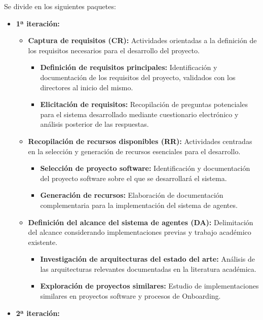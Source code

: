 Se divide en los siguientes paquetes:

\begin{itemize}
  \item\textbf{1ª iteración:}
    \begin{itemize}
      \item\textbf{Captura de requisitos (CR):} Actividades orientadas a la definición de los requisitos necesarios para el desarrollo del proyecto.
            \begin{itemize}
          \item\textbf{Definición de requisitos principales:} Identificación y documentación de los requisitos del proyecto, validados con los directores al inicio del mismo.
          \item\textbf{Elicitación de requisitos:} Recopilación de preguntas potenciales para el sistema desarrollado mediante cuestionario electrónico y análisis posterior de las respuestas.
        \end{itemize}
      \item\textbf{Recopilación de recursos disponibles (RR):} Actividades centradas en la selección y generación de recursos esenciales para el desarrollo.
        \begin{itemize}
          \item\textbf{Selección de proyecto software:} Identificación y documentación del proyecto software sobre el que se desarrollará el sistema.
          \item\textbf{Generación de recursos:} Elaboración de documentación complementaria para la implementación del sistema de agentes.
        \end{itemize}
      \item\textbf{Definición del alcance del sistema de agentes (DA):} Delimitación del alcance considerando implementaciones previas y trabajo académico existente.
    \begin{itemize}
          \item\textbf{Investigación de arquitecturas del estado del arte:} Análisis de las arquitecturas relevantes documentadas en la literatura académica.
          \item\textbf{Exploración de proyectos similares:} Estudio de implementaciones similares en proyectos software y procesos de Onboarding.
    \end{itemize}
      \end{itemize}
  \item\textbf{2ª iteración:}
    \begin{itemize}

\end{itemize}
\end{itemize}
